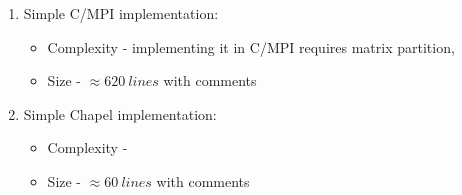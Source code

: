 \documentclass{article}
\begin{document}
        \begin{enumerate}[1.]
            \item Simple C/MPI implementation:
                \begin{itemize}
                    \item Complexity - implementing it in C/MPI requires matrix partition, 
                    \item Size - $\approx 620\ lines$ with comments
                \end{itemize}

            \item Simple Chapel implementation:
                \begin{itemize}
                    \item Complexity - 
                    \item Size - $\approx 60\ lines$ with comments
                \end{itemize}
        \end{enumerate}


\end{document}
